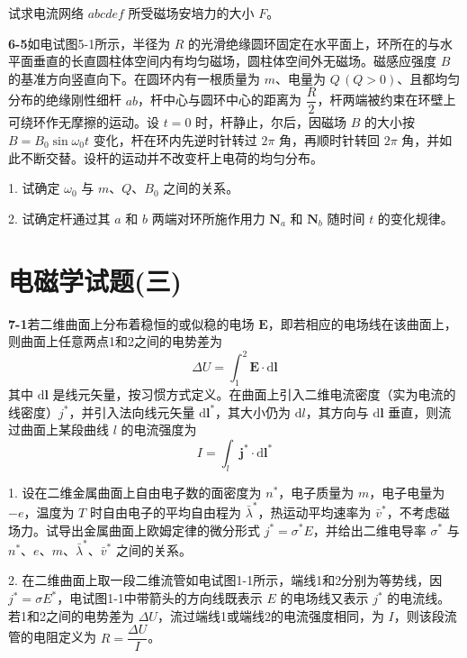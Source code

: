 试求电流网络 $abcdef$ 所受磁场安培力的大小 $F$。
\vfill

\newpage
\textbf{6-5}\quad 如电试图5-1所示，半径为 $R$ 的光滑绝缘圆环固定在水平面上，环所在的与水平面垂直的长直圆柱体空间内有均匀磁场，圆柱体空间外无磁场。磁感应强度 $B$ 的基准方向竖直向下。在圆环内有一根质量为 $m$、电量为 $Q\,(Q > 0)$、且都均匀分布的绝缘刚性细杆 $ab$，杆中心与圆环中心的距离为 $\dfrac{R}{2}$，杆两端被约束在环壁上可绕环作无摩擦的运动。设 $t = 0$ 时，杆静止，尔后，因磁场 $B$ 的大小按 $B = B_{0}\sin\omega_{0}t$ 变化，杆在环内先逆时针转过 $2\pi$ 角，再顺时针转回 $2\pi$ 角，并如此不断交替。设杆的运动并不改变杆上电荷的均匀分布。


1. 试确定 $\omega_{0}$ 与 $m$、$Q$、$B_{0}$ 之间的关系。

2. 试确定杆通过其 $a$ 和 $b$ 两端对环所施作用力 $\boldsymbol{N}_{a}$ 和 $\boldsymbol{N}_{b}$ 随时间 $t$ 的变化规律。

\vfill


\section*{电磁学试题(三)}
\vfill

\textbf{7-1}\quad 若二维曲面上分布着稳恒的或似稳的电场 $\boldsymbol{E}$，即若相应的电场线在该曲面上，则曲面上任意两点1和2之间的电势差为
$$
\Delta U = \int_{1}^{2} \boldsymbol{E} \cdot \mathrm{d}\boldsymbol{l}
$$
其中 $\mathrm{d}\boldsymbol{l}$ 是线元矢量，按习惯方式定义。在曲面上引入二维电流密度（实为电流的线密度）$j^{*}$，并引入法向线元矢量 $\mathrm{d}\boldsymbol{l}^{*}$，其大小仍为 $\mathrm{d}l$，其方向与 $\mathrm{d}\boldsymbol{l}$ 垂直，则流过曲面上某段曲线 $l$ 的电流强度为
$$
I = \int_{l} \boldsymbol{j}^{*} \cdot \mathrm{d}\boldsymbol{l}^{*}
$$

1. 设在二维金属曲面上自由电子数的面密度为 $n^{*}$，电子质量为 $m$，电子电量为 $-e$，温度为 $T$ 时自由电子的平均自由程为 $\bar{\lambda}^{*}$，热运动平均速率为 $\bar{v}^{*}$，不考虑磁场力。试导出金属曲面上欧姆定律的微分形式 $j^{*} = \sigma^{*}E$，并给出二维电导率 $\sigma^{*}$ 与 $n^{*}$、$e$、$m$、$\bar{\lambda}^{*}$、$\bar{v}^{*}$ 之间的关系。

2. 在二维曲面上取一段二维流管如电试图1-1所示，端线1和2分别为等势线，因 $j^{*} = \sigma E^{*}$，电试图1-1中带箭头的方向线既表示 $E$ 的电场线又表示 $j^{*}$ 的电流线。若1和2之间的电势差为 $\Delta U$，流过端线1或端线2的电流强度相同，为 $I$，则该段流管的电阻定义为 $R = \dfrac{\Delta U}{I}$。


